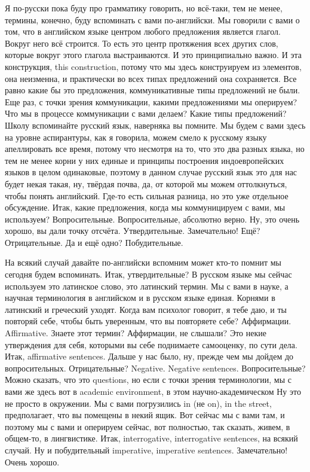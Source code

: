 \documentclass[main.tex]{subfiles}
\begin{document}
Я по-русски пока буду про грамматику говорить, но всё-таки, тем не менее, термины, конечно, буду вспоминать с вами по-английски.
Мы говорили с вами о том, что в английском языке центром любого предложения является глагол.
Вокруг него всё строится.
То есть это центр протяжения всех других слов, которые вокруг этого глагола выстраиваются.
И это принципиально важно.
И эта конструкция, this construction, потому что мы здесь конструируем из элементов, она неизменна, и практически во всех типах предложений она сохраняется.
Все равно какие бы это предложения, коммуникативные типы предложений не были.
Еще раз, с точки зрения коммуникации, какими предложениями мы оперируем?
Что мы в процессе коммуникации с вами делаем?
Какие типы предложений?
Школу вспоминайте русский язык, наверняка вы помните.
Мы будем с вами здесь на уровне аспирантуры, как я говорила, можем смело к русскому языку апеллировать все время, потому что несмотря на то, что это два разных языка, но тем не менее корни у них единые и принципы построения индоевропейских языков в целом одинаковые, поэтому в данном случае русский язык это для нас будет некая такая, ну, твёрдая почва, да, от которой мы можем оттолкнуться, чтобы понять английский.
Где-то есть сильная разница, но это уже отдельное обсуждение.
Итак, какие предложения, когда мы коммуницируем с вами, мы используем?
Вопросительные.
Вопросительные, абсолютно верно.
Ну, это очень хорошо, вы дали точку отсчёта.
Утвердительные.
Замечательно!
Ещё?
Отрицательные.
Да и ещё одно?
Побудительные.

На всякий случай давайте по-английски вспомним может кто-то помнит мы сегодня будем вспоминать.
Итак, утвердительные?
В русском языке мы сейчас используем это латинское слово, это латинский термин.
Мы с вами в науке, а научная терминология в английском и в русском языке единая.
Корнями в латинский и греческий уходят.
Когда вам психолог говорит, я тебе даю, и ты повторяй себе, чтобы быть уверенным, что вы повторяете себе?
Аффирмации.
Affirmative.
Знаете этот термин? Аффирмации, не слышали?
Это некие утверждения для себя, которыми вы себе поднимаете самооценку, по сути дела.
Итак, affirmative sentences.
Дальше у нас было, ну, прежде чем мы дойдем до вопросительных.
Отрицательные?
Negative.
Negative sentences.
Вопросительные?
Можно сказать, что это questions, но если с точки зрения терминологии, мы с вами же здесь вот в academic environment, в этом научно-академическом
Ну это не просто в окружении.
Мы с вами погрузились in (не on), in the street, предполагает, что вы помещены в некий ящик.
Вот сейчас мы с вами там, и поэтому мы с вами и оперируем сейчас, вот полностью, так сказать, живем, в общем-то, в лингвистике.
Итак, interrogative, interrogative sentences, на всякий случай.
Ну и побудительный imperative, imperative sentences.
Замечательно!
Очень хорошо.
\end{document}
